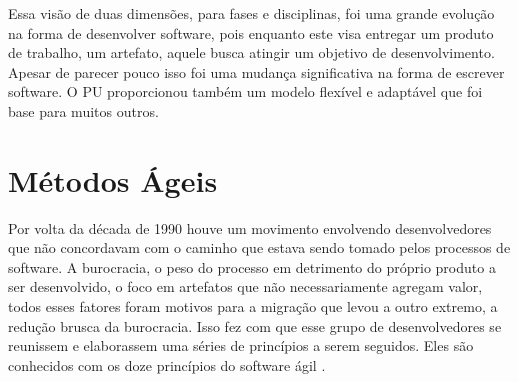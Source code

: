 \documentclass[
	article,			%
	11pt,				%
	oneside,			%
	a4paper,			%
	english,			%
	brazil,				%
	sumario=tradicional
	]{abntex2}
\begin{document}
Essa visão de duas dimensões, para fases e disciplinas, foi uma grande evolução
na forma de desenvolver software, pois enquanto este visa entregar um produto de
trabalho, um artefato, aquele busca atingir um objetivo de desenvolvimento.
Apesar de parecer pouco isso foi uma mudança significativa na forma de escrever
software. O PU proporcionou também um modelo flexível e adaptável que foi base
para muitos outros.

\section{Métodos Ágeis}

\label{metodos-ageis}

Por volta da década de 1990 houve um movimento envolvendo desenvolvedores que
não concordavam com o caminho que estava sendo tomado pelos processos de
software. A burocracia, o peso do processo em detrimento do próprio produto a
ser desenvolvido, o foco em artefatos que não necessariamente agregam valor,
todos esses fatores foram motivos para a migração que levou a outro extremo, a
redução brusca da burocracia. Isso fez com que esse grupo de desenvolvedores
se reunissem e elaborassem uma séries de princípios a serem seguidos. Eles são
conhecidos com os doze princípios do software ágil \cite{agilemanifesto}.
\end{document}
